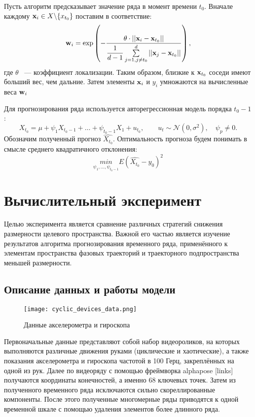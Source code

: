 \documentclass[a4paper, 12pt]{article}
\begin{document}
Пусть алгоритм предсказывает значение ряда в момент времени $t_0$. 
Вначале каждому $\mathbf{x}_i \in X \backslash \{ x_{t_0}\}$ поставим в соответствие: $$\mathbf{w}_i = \exp \left(-\dfrac{\theta \cdot ||\mathbf{x}_i - \mathbf{x}_{t_0}||}{\dfrac{1}{d-1} \sum\limits_{j=1, j \neq t_0}^d ||\mathbf{x}_j - \mathbf{x}_{t_0}||} \right), $$ 
где $\theta$ ~--- коэффициент локализации.
Таким образом, близкие к $\mathbf{x}_{t_0}$ соседи имеют больший вес, чем дальние. Затем элементы $\mathbf{x}_i$ и $y_i$ умножаются на вычисленные веса $\mathbf{w}_i$

Для прогнозирования ряда используется авторегрессионная модель порядка $t_0-1$:
$$ X_{t_0} = \mu + \psi_1 X_{t_0-1} + \ldots + \psi_{t_0-1} X_1 + u_{t_0}, \qquad u_t \sim \mathcal{N}(0, \sigma^2), \quad \psi_p \neq 0.$$
Обозначим полученный прогноз $\widehat{X_{t_0}}$.
Оптимальность прогноза будем понимать в смысле среднего квадратичного отклонения:
$$ \underset{\psi_1, \ldots, \psi_{t_0-1}}{min} E(\widehat{X_{t_0}} - y_0)^2$$


\section{Вычислительный эксперимент}
Целью эксперимента является сравнение различных стратегий снижения размерности целевого пространства. Важной его частью является изучение результатов алгоритма прогнозирования временного ряда, применённого к элементам пространства фазовых траекторий и траекторного подпространства меньшей размерности.

\subsection{Описание данных и работы модели}
\begin{figure}[bhtp]
	\texttt{[image: cyclic\_devices\_data.png]}
	\caption{Данные акселерометра и гироскопа}
	\label{fig:devices_data}
\end{figure}
Первоначальные данные представляют собой набор видеороликов, на которых выполняются различные движения руками (циклические и хаотические), а также показания акселерометра и гироскопа частотой в 100 Герц, закреплённых на одной из рук. 
Далее по видеоряду с помощью фреймворка alphapose [links] получаются координаты конечностей, а именно 68 ключевых точек. 
Затем из полученного временного ряда исключаются сильно скореллированные компоненты.
После этого полученные многомерные ряды приводятся к одной временной шкале с помощью удаления элементов более длинного ряда.
\end{document}
